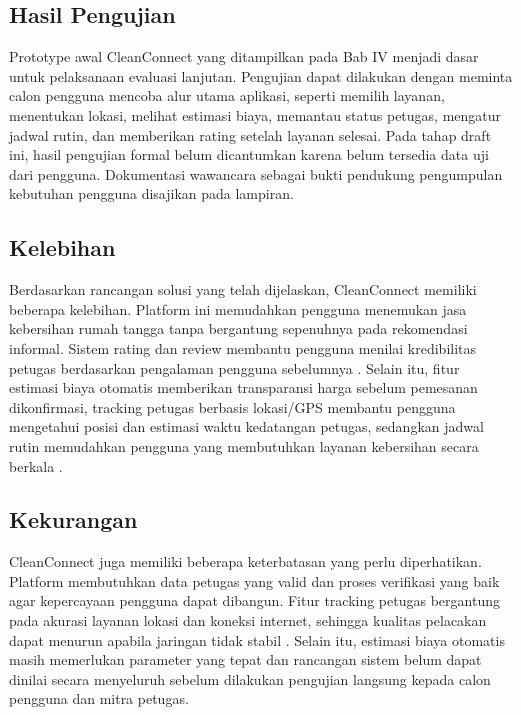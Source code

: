\subsection{Hasil Pengujian}

Prototype awal CleanConnect yang ditampilkan pada Bab IV menjadi dasar untuk pelaksanaan evaluasi lanjutan. Pengujian dapat dilakukan dengan meminta calon pengguna mencoba alur utama aplikasi, seperti memilih layanan, menentukan lokasi, melihat estimasi biaya, memantau status petugas, mengatur jadwal rutin, dan memberikan rating setelah layanan selesai. Pada tahap draft ini, hasil pengujian formal belum dicantumkan karena belum tersedia data uji dari pengguna. Dokumentasi wawancara sebagai bukti pendukung pengumpulan kebutuhan pengguna disajikan pada lampiran.

\subsection{Kelebihan}

Berdasarkan rancangan solusi yang telah dijelaskan, CleanConnect memiliki beberapa kelebihan. Platform ini memudahkan pengguna menemukan jasa kebersihan rumah tangga tanpa bergantung sepenuhnya pada rekomendasi informal. Sistem rating dan review membantu pengguna menilai kredibilitas petugas berdasarkan pengalaman pengguna sebelumnya \cite{Pena-garcia2024,Id2018}. Selain itu, fitur estimasi biaya otomatis memberikan transparansi harga sebelum pemesanan dikonfirmasi, tracking petugas berbasis lokasi/GPS membantu pengguna mengetahui posisi dan estimasi waktu kedatangan petugas, sedangkan jadwal rutin memudahkan pengguna yang membutuhkan layanan kebersihan secara berkala \cite{Bernarto2022,Alvin2025}.

\subsection{Kekurangan}

CleanConnect juga memiliki beberapa keterbatasan yang perlu diperhatikan. Platform membutuhkan data petugas yang valid dan proses verifikasi yang baik agar kepercayaan pengguna dapat dibangun. Fitur tracking petugas bergantung pada akurasi layanan lokasi dan koneksi internet, sehingga kualitas pelacakan dapat menurun apabila jaringan tidak stabil \cite{Hawlitschek2016,Li2020}. Selain itu, estimasi biaya otomatis masih memerlukan parameter yang tepat dan rancangan sistem belum dapat dinilai secara menyeluruh sebelum dilakukan pengujian langsung kepada calon pengguna dan mitra petugas.
